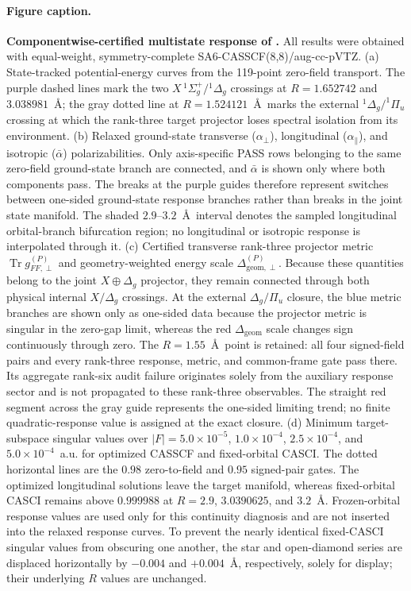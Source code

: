
\paragraph{Figure caption.}
\textbf{Componentwise-certified multistate response of .}
All results were obtained with equal-weight, symmetry-complete
SA6-CASSCF(8,8)/aug-cc-pVTZ. (a) State-tracked potential-energy curves from
the 119-point zero-field transport. The purple dashed lines mark the two
$X\,^1\Sigma_g^+/{}^1\Delta_g$ crossings at $R=1.652742$ and
$3.038981$~\AA; the gray dotted line at $R=1.524121$~\AA\ marks the
external $^1\Delta_g/^1\Pi_u$ crossing at which the rank-three target
projector loses spectral isolation from its environment. (b) Relaxed ground-state transverse
($\alpha_\perp$), longitudinal ($\alpha_\parallel$), and isotropic
($\bar\alpha$) polarizabilities. Only axis-specific PASS rows belonging to the
same zero-field ground-state branch are connected, and $\bar\alpha$ is shown
only where both components pass. The breaks at the purple guides therefore
represent switches between one-sided ground-state response branches rather
than breaks in the joint state manifold. The shaded
$2.9$--$3.2$~\AA\ interval denotes the sampled longitudinal orbital-branch
bifurcation region; no longitudinal or isotropic response is interpolated
through it. (c) Certified transverse rank-three projector metric
$\operatorname{Tr}g_{FF,\perp}^{(P)}$ and geometry-weighted energy scale
$\Delta_{\mathrm{geom},\perp}^{(P)}$. Because these quantities belong to the
joint $X\oplus\Delta_g$ projector, they remain connected through both physical
internal $X/\Delta_g$ crossings. At the external $\Delta_g/\Pi_u$ closure,
the blue metric branches are shown only as one-sided data because the
projector metric is singular in the zero-gap limit, whereas the red
$\Delta_{\mathrm{geom}}$ scale changes sign continuously through zero.
The $R=1.55$~\AA\ point is retained: all four signed-field pairs and every
rank-three response, metric, and common-frame gate pass there. Its aggregate
rank-six audit failure originates solely from the auxiliary response sector
and is not propagated to these rank-three observables. The straight red
segment across the gray guide represents the one-sided limiting trend; no
finite quadratic-response value is assigned at the exact closure. (d) Minimum target-subspace
singular values over $|F|=5.0\times10^{-5}$, $1.0\times10^{-4}$,
$2.5\times10^{-4}$, and $5.0\times10^{-4}$~a.u. for optimized CASSCF and
fixed-orbital CASCI. The dotted horizontal lines are the $0.98$ zero-to-field
and $0.95$ signed-pair gates. The optimized longitudinal solutions leave the
target manifold, whereas fixed-orbital CASCI remains above $0.999988$ at
$R=2.9$, $3.0390625$, and $3.2$~\AA. Frozen-orbital response values are used
only for this continuity diagnosis and are not inserted into the relaxed
response curves. To prevent the nearly identical fixed-CASCI singular values
from obscuring one another, the star and open-diamond series are displaced
horizontally by $-0.004$ and $+0.004$~\AA, respectively, solely for display;
their underlying $R$ values are unchanged.

